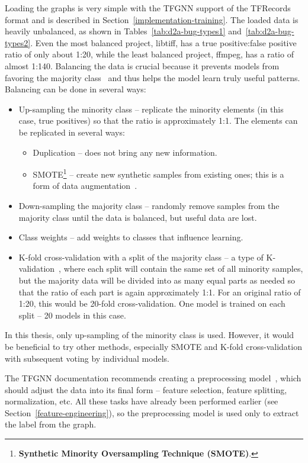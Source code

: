 Loading the graphs is very simple with the TFGNN support of the TFRecords format and is described in Section~\ref{implementation-training}. The loaded data is heavily unbalanced, as shown in Tables~\ref{tab:d2a-bug-types1} and~\ref{tab:d2a-bug-types2}. Even the most balanced project, libtiff, has a true positive:false positive ratio of only about 1:20, while the least balanced project, ffmpeg, has a ratio of almost 1:140. Balancing the data is crucial because it prevents models from favoring the majority class~\cite{balancing-data} and thus helps the model learn truly useful patterns. Balancing can be done in several ways:
\begin{itemize}
    \item Up-sampling the minority class -- replicate the minority elements (in this case, true positives) so that the ratio is approximately 1:1. The elements can be replicated in several ways:
    \begin{itemize}
        \item Duplication -- does not bring any new information.
        \item SMOTE\footnote{\textbf{Synthetic Minority Oversampling Technique (SMOTE)}.} -- create new synthetic samples from existing ones; this is a form of data augmentation~\cite{smote}.
    \end{itemize}
    \item Down-sampling the majority class -- randomly remove samples from the majority class until the data is balanced, but useful data are lost.
    \item Class weights -- add weights to classes that influence learning.
    \item K-fold cross-validation with a split of the majority class -- a type of K-validation~\cite{k-fold-validation}, where each split will contain the same set of all minority samples, but the majority data will be divided into as many equal parts as needed so that the ratio of each part is again approximately 1:1. For an original ratio of 1:20, this would be 20-fold cross-validation. One model is trained on each split -- 20 models in this case.
\end{itemize}

In this thesis, only up-sampling of the minority class is used. However, it would be beneficial to try other methods, especially SMOTE and K-fold cross-validation with subsequent voting by individual models.

The TFGNN documentation recommends creating a preprocessing model~\cite{tfgnn-input-pipeline}, which should adjust the data into its final form -- feature selection, feature splitting, normalization, etc. All these tasks have already been performed earlier (see Section~\ref{feature-engineering}), so the preprocessing model is used only to extract the label from the graph.

